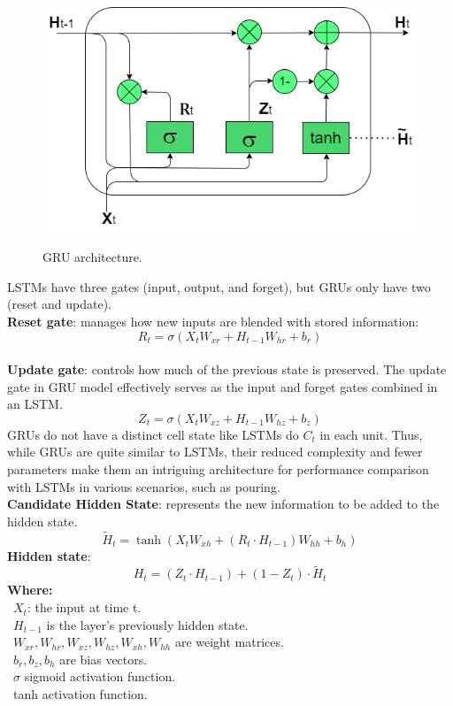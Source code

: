 \documentclass{ieeeojies}
\begin{document}
\begin{figure}[H]
  \centering
  \begin{minipage}{0.8\linewidth}
    \centering
    \includegraphics[width=\linewidth]{image/GRU.png}
    \label{fig8}
  \end{minipage}
  \caption{GRU architecture.}
\end{figure}
\noindent
LSTMs have three gates (input, output, and forget), but GRUs only have two (reset and update). \\
\textbf{Reset gate}: manages how new inputs are blended with stored information: \[R_t = \sigma(X_tW_{xr} + H_{t-1}W_{hr}+ b_r)\]\\
\textbf{Update gate}: controls how much of the previous state is preserved. The update gate in GRU model effectively serves as the input and forget gates combined in an LSTM.
\[Z_t = \sigma(X_tW_{xz} + H_{t-1}W_{hz}+ b_z)\]
GRUs do not have a distinct cell state like LSTMs do \(C_t\) in each unit. 
Thus, while GRUs are quite similar to LSTMs, their reduced complexity and fewer parameters make them an intriguing architecture for performance comparison with LSTMs in various scenarios, such as pouring.\\
\textbf{Candidate Hidden State}: represents the new information to be added to the hidden state.
\[\widetilde{H}_t = \tanh \left( X_t W_{xh} + (R_t \cdot H_{t-1}) W_{hh} + b_h \right)\]
\textbf{Hidden state}:\[H_t = (Z_t \cdot H_{t-1}) + (1-Z_t)\cdot \widetilde{H}_t \]
\textbf{Where:}\\
	\indent\textbullet\ \(X_t\): the input at time t.\\
        \indent\textbullet\ \(H_{t-1}\) is the layer’s previously hidden state.\\
	\indent\textbullet\ \(W_{xr}, W_{hr}, W_{xz}, W_{hz}, W_{xh}, W_{hh}\) are weight matrices.\\
	\indent\textbullet\ \(b_r, b_z, b_h\) are bias vectors.\\
	\indent\textbullet\ \(\sigma\) sigmoid activation function.\\
        \indent\textbullet\ tanh activation function.\\
\end{document}
